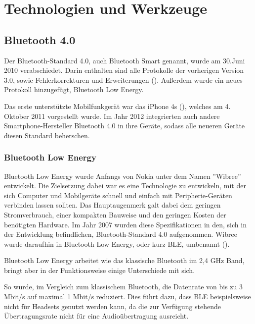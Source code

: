 \chapter{Technologien und Werkzeuge}
\label{chap:technologies}

\section{Bluetooth 4.0}
\label{sec:technologies:bluetooth4}

Der Bluetooth-Standard 4.0, auch Bluetooth Smart genannt, wurde am 30.Juni 2010 verabschiedet. Darin enthalten sind alle Protokolle der vorherigen Version 3.0, sowie Fehlerkorrekturen und Erweiterungen (\citet{bluetoothcore}). Außerdem wurde ein neues Protokoll hinzugefügt, Bluetooth Low Energy. 

Das erste unterstützte Mobilfunkgerät war das iPhone 4s (\citet{iphone4sspecs}), welches am 4. Oktober 2011 vorgestellt wurde. Im Jahr 2012 integrierten auch andere Smartphone-Hersteller Bluetooth 4.0 in ihre Geräte, sodass alle neueren Geräte diesen Standard beherschen.


\subsection{Bluetooth Low Energy}
\label{sec:technologies:bluetoothLE}

Bluetooth Low Energy wurde Anfangs von Nokia unter dem Namen ''Wibree'' entwickelt. Die Zielsetzung dabei war es eine Technologie zu entwickeln, mit der sich Computer und Mobilgeräte schnell und einfach mit Peripherie-Geräten verbinden lassen sollten. Das Hauptaugenmerk galt dabei dem geringen Stromverbrauch, einer kompakten Bauweise und den geringen Kosten der benötigten Hardware.
Im Jahr 2007 wurden diese Spezifikationen in den, sich in der Entwicklung befindlichen, Bluetooth-Standard 4.0 aufgenommen. Wibree wurde daraufhin in Bluetooth Low Energy, oder kurz BLE, umbenannt (\citet{wibree}).

Bluetooth Low Energy arbeitet wie das klassische Bluetooth im 2,4 GHz Band, bringt aber in der Funktionsweise einige Unterschiede mit sich.

So wurde, im Vergleich zum klassischem Bluetooth, die Datenrate von bis zu 3 Mbit/s auf maximal 1 Mbit/s reduziert. Dies führt dazu, dass BLE beispielsweise nicht für Headsets genutzt werden kann, da die zur Verfügung stehende Übertragungsrate nicht für eine Audioübertragung ausreicht.

